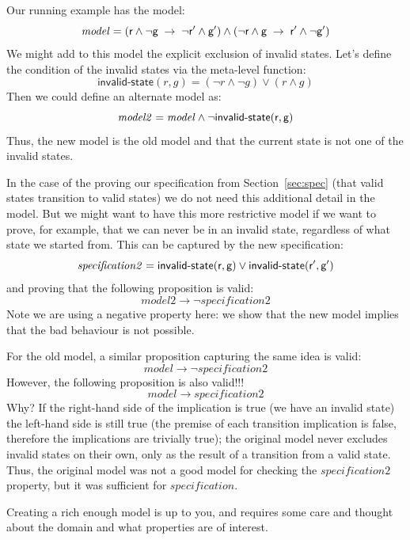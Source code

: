 \documentclass{article}
\theoremstyle{definition}
\begin{document}
Our running example has the model:
\begin{equation*}
\mathit{model} =
(\textsf{r}{} \wedge \neg\textsf{g}{} \; \rightarrow \; \neg\textsf{r}{}' \wedge
\textsf{g}{}')
\wedge
(\neg\textsf{r}{} \wedge \textsf{g}{} \; \rightarrow \; \textsf{r}{}' \wedge \neg\textsf{g}{}')
\end{equation*}
%
We might add to this model the explicit exclusion of invalid
states. Let's define the condition of the invalid states via the meta-level function:
%
\begin{equation*}
\textsf{invalid-state}(r, g) = (\neg r \wedge \neg g) \vee (r \wedge g)
\end{equation*}
%
Then we could define an alternate model as:
%
\begin{equation*}
\mathit{model2} = \mathit{model} \wedge \neg \textsf{invalid-state}(\textsf{r}, \textsf{g})
\end{equation*}
%
Thus, the new model is the old model and that the current state is not
one of the invalid states.

In the case of the proving our specification from
Section~\ref{sec:spec} (that valid states transition to valid states)
we do not need this additional detail in the model. But we might want
to have this more restrictive model if we want to prove, for example,
that we can never be in an invalid state, regardless of what state we
started from. This can be captured by the new specification:
%
\begin{equation*}
\mathit{specification2} = \textsf{invalid-state}(\textsf{r}, \textsf{g})
\vee \textsf{invalid-state}(\textsf{r}', \textsf{g}')
\end{equation*}
%
and proving that the following proposition is valid:
$$
\mathit{model2} \rightarrow
\neg \mathit{specification2}
$$
Note we are using a negative property
here: we show that the new model implies that the bad behaviour is not possible.

For the old model, a similar proposition capturing the same idea is valid:
$$
\mathit{model} \rightarrow \neg \mathit{specification2}
$$
However, the following proposition is also valid!!!
$$
\mathit{model} \rightarrow \mathit{specification2}
$$
Why? If the right-hand side of the implication is true (we have an
invalid state) the left-hand side is still true (the premise of each
transition implication is false, therefore the implications are
trivially true); the original model never excludes invalid states on
their own, only as the result of a transition from a valid
state. Thus, the original model was not a good model for checking the
$\mathit{specification2}$ property, but it was sufficient for
$\mathit{specification}$.

Creating a rich enough model is up to you, and requires some care and
thought about the domain and what properties are of interest.
\end{document}
